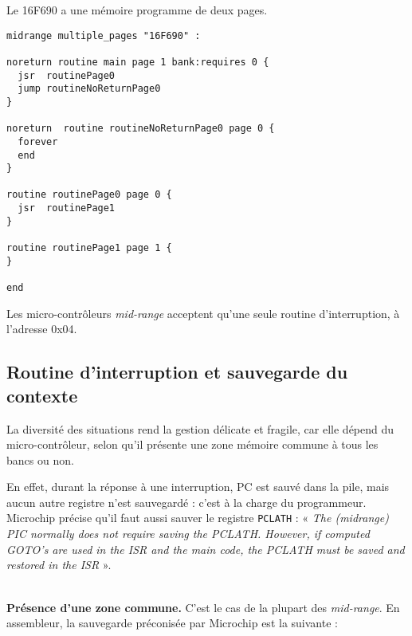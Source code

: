 Le 16F690 a une mémoire programme de deux pages. 

\begin{lstlisting}[language=piccolo]
midrange multiple_pages "16F690" :

noreturn routine main page 1 bank:requires 0 {
  jsr  routinePage0
  jump routineNoReturnPage0
}

noreturn  routine routineNoReturnPage0 page 0 {
  forever
  end
}

routine routinePage0 page 0 {
  jsr  routinePage1
}

routine routinePage1 page 1 {
}

end
\end{lstlisting}















Les micro-contrôleurs \emph{mid-range} acceptent qu’une seule routine d’interruption, à l’adresse 0x04.



\subsection{Routine d’interruption et sauvegarde du contexte}

La diversité des situations rend la gestion délicate et fragile, car elle dépend du micro-contrôleur, selon qu'il présente une zone mémoire commune à tous les bancs ou non.

En effet, durant la réponse à une interruption, PC est sauvé dans la pile, mais aucun autre registre n’est sauvegardé : c’est à la charge du programmeur. Microchip précise qu’il faut aussi sauver le registre \texttt{PCLATH} : « \emph{The (midrange) PIC normally does not require saving the PCLATH. However, if computed GOTO’s are used in the ISR and the main code, the PCLATH must be saved and restored in the ISR} ».



~\\
\textbf{Présence d’une zone commune.} C'est le cas de la plupart des \emph{mid-range}. En assembleur, la sauvegarde préconisée par Microchip est la suivante :

